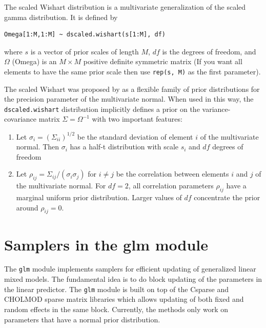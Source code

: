\documentclass[11pt, a4paper, titlepage]{report}
\begin{document}
{The scaled Wishart distribution is a multivariate generalization
of the scaled gamma distribution. It is defined by
\begin{verbatim}
Omega[1:M,1:M] ~ dscaled.wishart(s[1:M], df)
\end{verbatim}
where $s$ is a vector of prior scales of length $M$, $df$ is the
degrees of freedom, and $\Omega$ (Omega) is an $M \times M$ positive
definite symmetric matrix (If you want all elements to have the
same prior scale then use \texttt{rep(s, M)} as the first parameter).

The scaled Wishart was proposed by \citet{HuangWand2013} as a flexible
family of prior distributions for the precision parameter of the
multivariate normal. When used in this way, the
\texttt{dscaled.wishart} distribution implicitly defines a prior on
the variance-covariance matrix $\Sigma = \Omega^{-1}$ with two
important features:
\begin{enumerate}
\item Let $\sigma_i = (\Sigma_{ii})^{1/2}$ be the standard deviation of
  element $i$ of the multivariate normal. Then $\sigma_i$ has a
  half-t distribution with scale $s_i$ and $df$ degrees of freedom
\item Let $\rho_{ij} = \Sigma_{ij}/(\sigma_i \sigma_j)$ for $i \neq j$
  be the correlation between elements $i$ and $j$ of the multivariate
  normal. For $df=2$, all correlation parameters $\rho_{ij}$ have a
  marginal uniform prior distribution. Larger values of $df$
  concentrate the prior around $\rho_{ij} = 0$.
\end{enumerate}


\section{Samplers in the glm module}
\label{section:glm::samplers}

The \texttt{glm} module implements samplers for efficient updating of
generalized linear mixed models.  The fundamental idea is to do block
updating of the parameters in the linear predictor.  The \texttt{glm}
module is built on top of the \textsf{Csparse} and \textsf{CHOLMOD}
sparse matrix libraries \citep{Davis2006, Davis1999} which allows
updating of both fixed and random effects in the same
block. Currently, the methods only work on parameters that have a
normal prior distribution.

}
\end{document}
